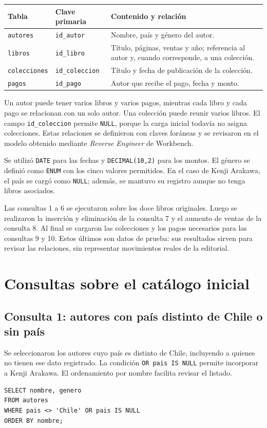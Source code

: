 \documentclass[11pt,a4paper]{article}
\newcommand{\consulta}[1]{\Needspace{20\baselineskip}\subsection{#1}}
\begin{document}
\begin{center}
\small
\begin{tabularx}{\linewidth}{@{}l l X@{}}
\toprule
\textbf{Tabla} & \textbf{Clave primaria} & \textbf{Contenido y relación} \\
\midrule
\texttt{autores} & \texttt{id\_autor} & Nombre, país y género del autor. \\
\texttt{libros} & \texttt{id\_libro} & Título, páginas, ventas y año; referencia al autor y, cuando corresponde, a una colección. \\
\texttt{colecciones} & \texttt{id\_coleccion} & Título y fecha de publicación de la colección. \\
\texttt{pagos} & \texttt{id\_pago} & Autor que recibe el pago, fecha y monto. \\
\bottomrule
\end{tabularx}
\end{center}

Un autor puede tener varios libros y varios pagos, mientras cada libro y cada pago se relacionan con un solo autor. Una colección puede reunir varios libros. El campo \texttt{id\_coleccion} permite \texttt{NULL}, porque la carga inicial todavía no asigna colecciones. Estas relaciones se definieron con claves foráneas y se revisaron en el modelo obtenido mediante \textit{Reverse Engineer} de Workbench.

Se utilizó \texttt{DATE} para las fechas y \texttt{DECIMAL(10,2)} para los montos. El género se definió como \texttt{ENUM} con los cinco valores permitidos. En el caso de Kenji Arakawa, el país se cargó como \texttt{NULL}; además, se mantuvo su registro aunque no tenga libros asociados.

Las consultas 1 a 6 se ejecutaron sobre los doce libros originales. Luego se realizaron la inserción y eliminación de la consulta 7 y el aumento de ventas de la consulta 8. Al final se cargaron las colecciones y los pagos necesarios para las consultas 9 y 10. Estos últimos son datos de prueba: sus resultados sirven para revisar las relaciones, sin representar movimientos reales de la editorial.

\section{Consultas sobre el catálogo inicial}

\consulta{Consulta 1: autores con país distinto de Chile o sin país}

Se seleccionaron los autores cuyo país es distinto de Chile, incluyendo a quienes no tienen ese dato registrado. La condición \texttt{OR pais IS NULL} permite incorporar a Kenji Arakawa. El ordenamiento por nombre facilita revisar el listado.
\par\noindent\begin{minipage}{\linewidth}
\begin{lstlisting}
SELECT nombre, genero
FROM autores
WHERE pais <> 'Chile' OR pais IS NULL
ORDER BY nombre;
\end{lstlisting}
\end{minipage}\par
\end{document}
